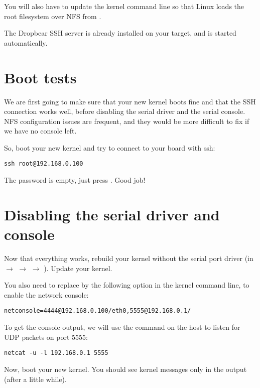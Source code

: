 You will also have to update the kernel command line so that Linux
loads the root filesystem over NFS from
.

The Dropbear SSH server is already installed on your target, and is
started automatically.

\section{Boot tests}

We are first going to make sure that your new kernel boots fine and
that the SSH connection works well, before disabling the serial driver
and the serial console. NFS configuration issues are frequent, and
they would be more difficult to fix if we have no console left.

So, boot your new kernel and try to connect to your board with ssh:

\begin{verbatim}
ssh root@192.168.0.100
\end{verbatim}

The  password is empty, just press . Good job!

\section{Disabling the serial driver and console}

Now that everything works, rebuild your kernel without the serial port
driver (in  $\rightarrow$ 
$\rightarrow$  $\rightarrow$ ). Update your kernel.

You also need to replace  by the following option in
the kernel command line, to enable the network console:

\begin{verbatim}
netconsole=4444@192.168.0.100/eth0,5555@192.168.0.1/
\end{verbatim}

To get the console output, we will use the  command on the host
to listen for UDP packets on port 5555:

\begin{verbatim}
netcat -u -l 192.168.0.1 5555
\end{verbatim}

Now, boot your new kernel. You should see kernel messages only in the
 output (after a little while).

